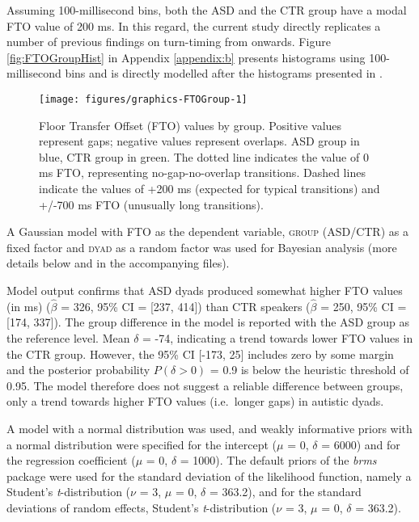 Assuming 100-millisecond bins, both the ASD and the CTR group have a modal FTO value of 200 ms. In this regard, the current study directly replicates a number of previous findings on turn-timing from \citet{stiversUniversalsCulturalVariation2009} onwards.
Figure \ref{fig:FTOGroupHist} in Appendix \ref{appendix:b} presents histograms using 100-millisecond bins and is directly modelled after the histograms presented in \citet{levinsonTimingTurntakingIts2015a}.



\begin{figure}

{\centering \texttt{[image: figures/graphics-FTOGroup-1]} 
	
}

\caption{Floor Transfer Offset (FTO) values by group. Positive values represent gaps; negative values represent overlaps. ASD group in blue, CTR group in green. The dotted line indicates the value of 0 ms FTO, representing no-gap-no-overlap transitions. Dashed lines indicate the values of +200 ms (expected for typical transitions) and +/-700 ms FTO (unusually long transitions).}\label{fig:FTOGroup}
\end{figure}

\label{turntaking_results_FTO_group_Bayes}

A Gaussian model with \textsc{FTO} as the dependent variable, \textsc{group} (ASD/CTR) as a fixed factor and \textsc{dyad} as a random factor was used for Bayesian analysis (more details below and in the accompanying files).

Model output confirms that ASD dyads produced somewhat higher FTO values (in ms) (\(\hat{\beta}\) = 326, 95\% CI = {[}237, 414{]}) than CTR speakers (\(\hat{\beta}\) = 250, 95\% CI = {[}174, 337{]}). The group difference in the model is reported with the ASD group as the reference level. Mean \(\delta\) = -74, indicating a trend towards lower FTO values in the CTR group. However, the 95\% CI {[}-173, 25{]} includes zero by some margin and the posterior probability \(P(\delta > 0)\) = 0.9 is below the heuristic threshold of 0.95. The model therefore does not suggest a reliable difference between groups, only a trend towards higher FTO values (i.e.~longer gaps) in autistic dyads.

A model with a normal distribution was used, and weakly informative priors with a normal distribution were specified for the intercept (\(\mu\) = 0, \(\delta\) = 6000) and for the regression coefficient (\(\mu\) = 0, \(\delta\) = 1000). The default priors of the \emph{brms} package were used for the standard deviation of the likelihood function, namely a Student's \emph{t}-distribution (\(\nu\) = 3, \(\mu\) = 0, \(\delta\) = 363.2), and for the standard deviations of random effects, Student's \emph{t}-distribution (\(\nu\) = 3, \(\mu\) = 0, \(\delta\) = 363.2).

